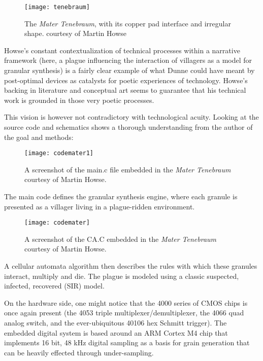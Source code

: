\citep{howse2015}
	
	\begin{figure}[H]
	  \centering
	    \texttt{[image: tenebraum]}
	     \caption{The \textit{Mater Tenebraum}, with its copper pad interface and irregular shape. courtesy of Martin Howse}
	\end{figure}
	
Howse's constant contextualization of technical processes within a narrative framework (here, a plague influencing the interaction of villagers as a model for granular synthesis) is a fairly clear example of what Dunne could have meant by post-optimal devices as catalysts for poetic experiences of technology. Howse's backing in literature and conceptual art seems to guarantee that his technical work is grounded in those very poetic processes. 

This vision is however not contradictory with technological acuity. Looking at the source code and schematics shows a thorough understanding from the author of the goal and methods: 

\begin{figure}[H]
	  \centering
	    \texttt{[image: codemater1]}
	    \caption{A screenshot of the main.c file embedded in the \textit{Mater Tenebraum} courtesy of Martin Howse.}
	\end{figure}

The main code defines the granular synthesis engine, where each granule is presented as a villager living in a plague-ridden environment. 

\begin{figure}[H]
	  \centering
	    \texttt{[image: codemater]}
	    \caption{A screenshot of the CA.C embedded in the \textit{Mater Tenebraum} courtesy of Martin Howse.}
	\end{figure}
	
A cellular automata algorithm then describes the rules with which these granules interact, multiply and die. The plague is modeled using a classic suspected, infected, recovered (SIR) model. 

On the hardware side, one might notice that the 4000 series of CMOS chips is once again present (the 4053 triple multiplexer/demultiplexer, the 4066 quad analog switch, and the ever-ubiquitous 40106 hex Schmitt trigger). The embedded digital system is based around an ARM Cortex M4 chip that implements 16 bit, 48 kHz digital sampling as a basis for grain generation that can be heavily effected through under-sampling. 

